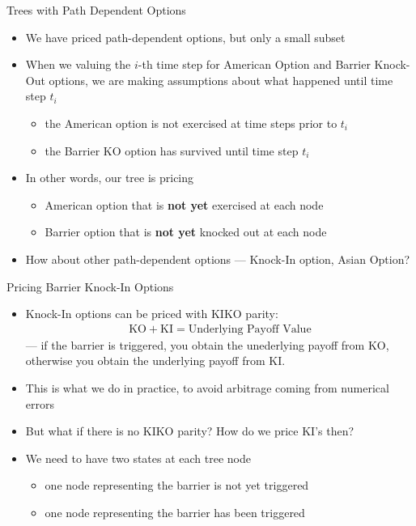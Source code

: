 \begin{frame}{Trees with Path Dependent Options}
\begin{itemize}
    \item We have priced path-dependent options, but only a small subset
    \item When we valuing the $i$-th time step for American Option and Barrier Knock-Out options, we are making assumptions about what happened until time step $t_i$
    \begin{itemize}
        \item the American option is not exercised at time steps prior to $t_i$
        \item the Barrier KO option has survived until time step $t_i$
    \end{itemize}
    \item In other words, our tree is pricing
    \begin{itemize}
        \item American option that is \textbf{not yet} exercised at each node
        \item Barrier option that is \textbf{not yet} knocked out at each node
    \end{itemize}
    \item How about other path-dependent options --- Knock-In option, Asian Option?
\end{itemize}
\end{frame}

\begin{frame}{Pricing Barrier Knock-In Options}
\begin{itemize}
    \item Knock-In options can be priced with KIKO parity:
    \begin{align*}
    \text{KO} + \text{KI} = \text{Underlying Payoff Value}
    \end{align*}
    --- if the barrier is triggered, you obtain the unederlying payoff from KO, otherwise you obtain the underlying payoff from KI.
    \item This is what we do in practice, to avoid arbitrage coming from numerical errors
    \item But what if there is no KIKO parity? How do we price KI's then?
    \pause
    \item We need to have two states at each tree node
    \begin{itemize}
    \item one node representing the barrier is not yet triggered
    \item one node representing the barrier has been triggered
    \end{itemize}
\end{itemize}
\end{frame}

